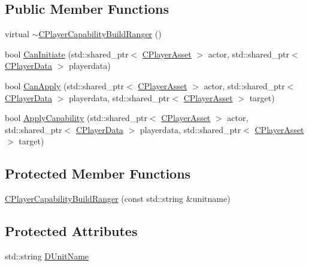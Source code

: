 \subsection*{Public Member Functions}
\begin{DoxyCompactItemize}
\item 
virtual \hyperlink{classCPlayerCapabilityBuildRanger_a624146c70790e8a3d85db28a42a466d2}{$\sim$\+C\+Player\+Capability\+Build\+Ranger} ()
\item 
bool \hyperlink{classCPlayerCapabilityBuildRanger_ad8b45a3ffc7ee82d5550cc690823d82c}{Can\+Initiate} (std\+::shared\+\_\+ptr$<$ \hyperlink{classCPlayerAsset}{C\+Player\+Asset} $>$ actor, std\+::shared\+\_\+ptr$<$ \hyperlink{classCPlayerData}{C\+Player\+Data} $>$ playerdata)
\item 
bool \hyperlink{classCPlayerCapabilityBuildRanger_a2e688d8f68ab53402afe9303dd28754a}{Can\+Apply} (std\+::shared\+\_\+ptr$<$ \hyperlink{classCPlayerAsset}{C\+Player\+Asset} $>$ actor, std\+::shared\+\_\+ptr$<$ \hyperlink{classCPlayerData}{C\+Player\+Data} $>$ playerdata, std\+::shared\+\_\+ptr$<$ \hyperlink{classCPlayerAsset}{C\+Player\+Asset} $>$ target)
\item 
bool \hyperlink{classCPlayerCapabilityBuildRanger_a113a97c3d833f206d333cb0e2e37aa31}{Apply\+Capability} (std\+::shared\+\_\+ptr$<$ \hyperlink{classCPlayerAsset}{C\+Player\+Asset} $>$ actor, std\+::shared\+\_\+ptr$<$ \hyperlink{classCPlayerData}{C\+Player\+Data} $>$ playerdata, std\+::shared\+\_\+ptr$<$ \hyperlink{classCPlayerAsset}{C\+Player\+Asset} $>$ target)
\end{DoxyCompactItemize}
\subsection*{Protected Member Functions}
\begin{DoxyCompactItemize}
\item 
\hyperlink{classCPlayerCapabilityBuildRanger_adb3602c8f527157dcd0c9289272a9aa0}{C\+Player\+Capability\+Build\+Ranger} (const std\+::string \&unitname)
\end{DoxyCompactItemize}
\subsection*{Protected Attributes}
\begin{DoxyCompactItemize}
\item 
std\+::string \hyperlink{classCPlayerCapabilityBuildRanger_a4e85674699365fe1e77bcb2a1996d7ba}{D\+Unit\+Name}
\end{DoxyCompactItemize}
